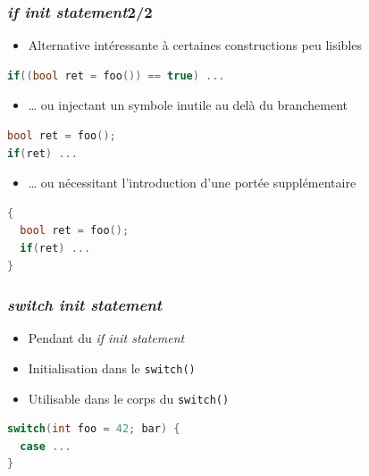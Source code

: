 \documentclass[C++.tex]{subfiles}
\begin{document}
\begin{frame}[fragile]
	\frametitle{\textit{if init statement}\titlehfill{}2/2}
	\begin{itemize}
		\item Alternative intéressante à certaines constructions peu lisibles
	\end{itemize}

	\begin{lstlisting}[language=C++]
if((bool ret = foo()) == true) ...\end{lstlisting}

	\begin{itemize}
		\item \ldots{} ou injectant un symbole inutile au delà du branchement
	\end{itemize}

	\begin{lstlisting}[language=C++]
bool ret = foo();
if(ret) ...\end{lstlisting}

	\begin{itemize}
		\item \ldots{} ou nécessitant l'introduction d'une portée supplémentaire
	\end{itemize}

	\begin{lstlisting}[language=C++]
{
  bool ret = foo();
  if(ret) ...
}\end{lstlisting}
\end{frame}

\begin{frame}[fragile]
	\frametitle{\textit{switch init statement}}
	\begin{itemize}
		\item Pendant du \textit{if init statement}
		\item Initialisation dans le \lstinline|switch()|
		\item Utilisable dans le corps du \lstinline|switch()|
	\end{itemize}

	\begin{lstlisting}[language=C++]
switch(int foo = 42; bar) {
  case ...
}\end{lstlisting}
\end{frame}
\end{document}
